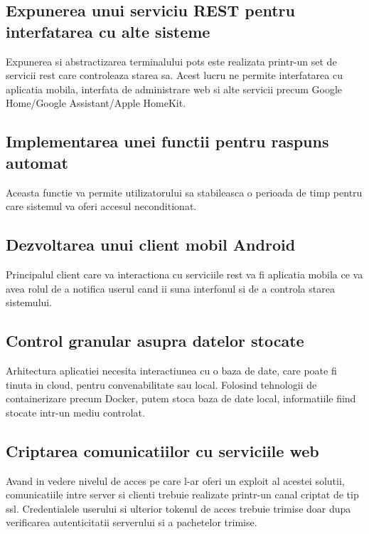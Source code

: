 \subsection{Expunerea unui serviciu REST pentru interfatarea cu alte sisteme}

Expunerea si abstractizarea terminalului \acrshort{pots} este realizata printr-un set de servicii \acrfull{rest} care controleaza starea sa. Acest lucru ne permite interfatarea cu aplicatia mobila, interfata de administrare web si alte servicii precum Google Home/Google Assistant/Apple HomeKit.

\subsection{Implementarea unei functii pentru raspuns automat}

Aceasta functie va permite utilizatorului sa stabileasca o perioada de timp pentru care sistemul va oferi accesul neconditionat.

\subsection{Dezvoltarea unui client mobil Android}

Principalul client care va interactiona cu serviciile \acrshort{rest} va fi aplicatia mobila ce va avea rolul de a notifica userul cand ii suna interfonul si de a controla starea sistemului.

\subsection{Control granular asupra datelor stocate}

Arhitectura aplicatiei necesita interactiunea cu o baza de date, care poate fi tinuta in cloud, pentru convenabilitate sau local.
Folosind tehnologii de containerizare precum Docker, putem stoca baza de date local, informatiile fiind stocate intr-un mediu controlat.

\subsection{Criptarea comunicatiilor cu serviciile web}

Avand in vedere nivelul de acces pe care l-ar oferi un exploit al acestei solutii, comunicatiile intre server si clienti trebuie realizate printr-un canal criptat de tip \acrfull{ssl}. Credentialele userului si ulterior tokenul de acces trebuie trimise doar dupa verificarea autenticitatii serverului si a pachetelor trimise.

